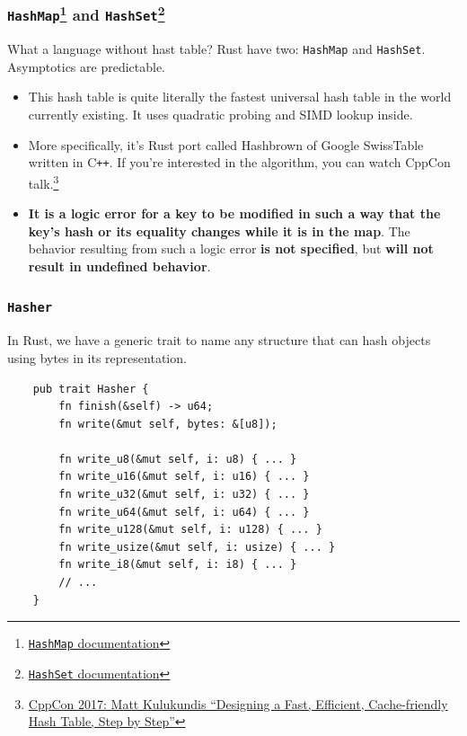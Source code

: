 \documentclass[aspectratio=1610,t]{beamer}
\begin{document}

\begin{frame}[fragile]
\frametitle{\texttt{HashMap}\footnote{\href{https://doc.rust-lang.org/std/collections/struct.HashMap.html}{\texttt{HashMap} documentation}} and \texttt{HashSet}\footnote{\href{https://doc.rust-lang.org/std/collections/struct.HashSet.html}{\texttt{HashSet} documentation}}}
What a language without hast table? Rust have two: \texttt{HashMap} and \texttt{HashSet}. Asymptotics are predictable.

\begin{itemize}
    \item<2-> This hash table is quite literally the fastest universal hash table in the world currently existing. It uses quadratic probing and SIMD lookup inside.
    \item<3-> More specifically, it's Rust port called Hashbrown of Google SwissTable written in C\texttt{++}. If you're interested in the algorithm, you can watch CppCon talk.\footnote{\href{https://www.youtube.com/watch?v=ncHmEUmJZf4}{CppCon 2017: Matt Kulukundis ``Designing a Fast, Efficient, Cache-friendly Hash Table, Step by Step''}}
    \item<4-> \textbf{It is a logic error for a key to be modified in such a way that the key's hash or its equality changes while it is in the map}. The behavior resulting from such a logic error \textbf{is not specified}, but \textbf{will not result in undefined behavior}.
\end{itemize}
\end{frame}


\begin{frame}[fragile]
\frametitle{\texttt{Hasher}}
In Rust, we have a generic trait to name any structure that can hash objects using bytes in its representation.

\begin{verbatim}
    pub trait Hasher {
        fn finish(&self) -> u64;
        fn write(&mut self, bytes: &[u8]);

        fn write_u8(&mut self, i: u8) { ... }
        fn write_u16(&mut self, i: u16) { ... }
        fn write_u32(&mut self, i: u32) { ... }
        fn write_u64(&mut self, i: u64) { ... }
        fn write_u128(&mut self, i: u128) { ... }
        fn write_usize(&mut self, i: usize) { ... }
        fn write_i8(&mut self, i: i8) { ... }
        // ...
    }
\end{verbatim}
\end{frame}
\end{document}
